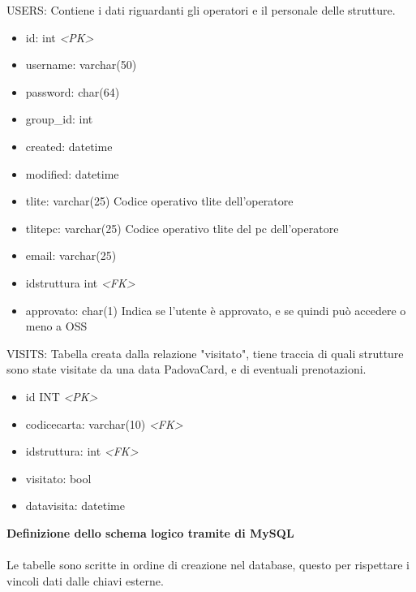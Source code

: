 USERS: Contiene i dati riguardanti gli operatori e il personale delle strutture.
\begin{itemize}
\item id: int \textit{\textless PK\textgreater}
\item username: varchar(50)
\item password: char(64)
\item group\_id: int 
\item created: datetime
\item modified: datetime
\item tlite: varchar(25) Codice operativo tlite dell'operatore
\item tlitepc: varchar(25) Codice operativo tlite del pc dell'operatore
\item email: varchar(25)
\item idstruttura int \textit{\textless FK\textgreater}
\item approvato: char(1) Indica se l'utente è approvato, e se quindi può accedere o meno a OSS
\end{itemize}
VISITS: Tabella creata dalla relazione "visitato", tiene traccia di quali strutture sono state visitate da una data PadovaCard, e di eventuali prenotazioni.
\begin{itemize}
\item id INT \textit{\textless PK\textgreater}
\item codicecarta: varchar(10) \textit{\textless FK\textgreater}
\item idstruttura: int \textit{\textless FK\textgreater}
\item visitato: bool
\item datavisita: datetime
\end{itemize}
\textbf{Definizione dello schema logico tramite  di MySQL} \\ \\
Le tabelle sono scritte in ordine di creazione nel database, questo per rispettare i vincoli dati dalle chiavi esterne.
\lstset{frame=single}
